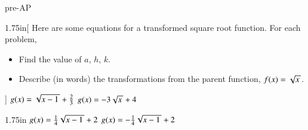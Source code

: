 \begin{taggedblock}{pre-AP}

\begin{my2Problems}[\normalsize]{1.75in}[%
    Here are some equations for a transformed square root function.
    For each problem,
    \vspace{-1em}
    \begin{itemize}[nosep]
        \item Find the value of $a$, $h$, $k$. 
        \item Describe (in words) the transformations from the parent function, $f(x)=\myRoot{x}$.
    \end{itemize}
    ]
    {
        $g(x) = \myRoot{x-1}+\frac{2}{3}$
    }
    {
        $g(x) = -3\myRoot{x} + 4$
    }
\end{my2Problems}
\begin{my2Problems}[\normalsize]{1.75in}
    {
        $g(x) = \frac{1}{4}\myRoot{x-1}+2$
    }
    {
        $g(x) = -\frac{1}{4}\myRoot{x-1}+2$
    }
\end{my2Problems}
    


\end{taggedblock}
